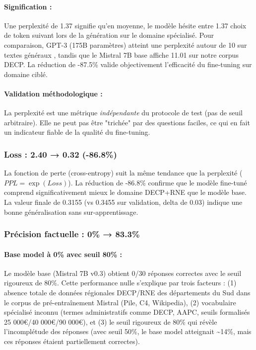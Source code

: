 \paragraph{Signification :}
Une perplexité de 1.37 signifie qu'en moyenne, le modèle hésite entre 1.37 choix de token suivant lors de la génération sur le domaine spécialisé. Pour comparaison, GPT-3 (175B paramètres) atteint une perplexité autour de 10 sur textes généraux \citep{brown2020gpt3}, tandis que le Mistral 7B base affiche 11.01 sur notre corpus DECP. La réduction de -87.5\% valide objectivement l'efficacité du fine-tuning sur domaine ciblé.

\paragraph{Validation méthodologique :}
La perplexité est une métrique \textit{indépendante} du protocole de test (pas de seuil arbitraire). Elle ne peut pas être "trichée" par des questions faciles, ce qui en fait un indicateur fiable de la qualité du fine-tuning.

\subsubsection{Loss : 2.40 → 0.32 (-86.8\%)}

La fonction de perte (cross-entropy) suit la même tendance que la perplexité ($PPL = \exp(Loss)$). La réduction de -86.8\% confirme que le modèle fine-tuné \og comprend\fg{} significativement mieux le domaine DECP+RNE que le modèle base. La valeur finale de 0.3155 (vs 0.3455 sur validation, delta de 0.03) indique une bonne généralisation sans sur-apprentissage.

\subsubsection{Précision factuelle : 0\% → 83.3\%}

\paragraph{Base model à 0\% avec seuil 80\% :} 
Le modèle base (Mistral 7B v0.3) obtient 0/30 réponses correctes avec le seuil rigoureux de 80\%. Cette performance nulle s'explique par trois facteurs : (1) absence totale de données régionales DECP/RNE des départements du Sud dans le corpus de pré-entraînement Mistral (Pile, C4, Wikipedia), (2) vocabulaire spécialisé inconnu (termes administratifs comme DECP, AAPC, seuils formalisés 25 000€/40 000€/90 000€), et (3) le seuil rigoureux de 80\% qui révèle l'incomplétude des réponses (avec seuil 50\%, le base model atteignait \textasciitilde{}14\%, mais ces réponses étaient partiellement correctes).

